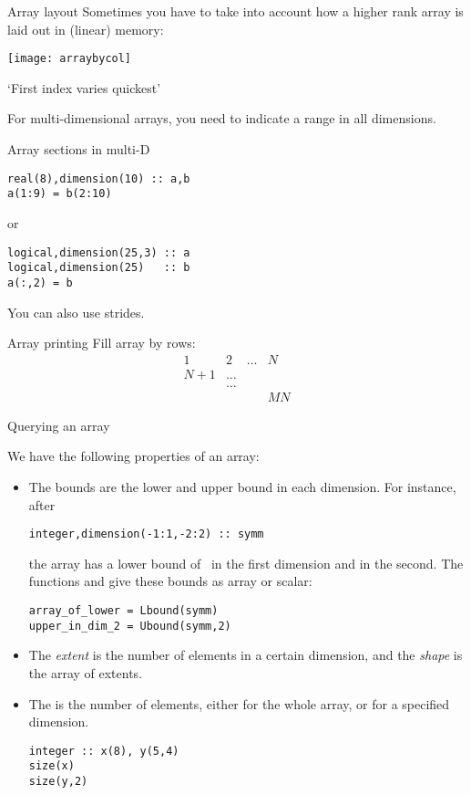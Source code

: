 \begin{block}{Array layout}
  \label{sl:farray-layout}
  Sometimes you have to take into account how a higher rank array
  is laid out in (linear) memory:

  \texttt{[image: arraybycol]}

  `First index varies quickest'
\end{block}

For multi-dimensional arrays, you need to indicate a range in all
dimensions.

\begin{block}{Array sections in multi-D}
  \label{sl:farray-sectiond}
\begin{verbatim}
real(8),dimension(10) :: a,b
a(1:9) = b(2:10)
\end{verbatim}
or
\begin{verbatim}
logical,dimension(25,3) :: a
logical,dimension(25)   :: b
a(:,2) = b
\end{verbatim}
You can also use strides.
\end{block}

\begin{block}{Array printing}
  \label{sl:farray-print}
  Fill array by rows:
  \[ \begin{matrix}1&2&\ldots&N\\ N+1&\ldots\\ &\ldots\\ &&&MN
  \end{matrix}
  \]
\end{block}

 {Querying an array}

We have the following properties of an array:
\begin{itemize}
\item The bounds are the lower and upper bound in each dimension.
  For instance, after
\begin{verbatim}
integer,dimension(-1:1,-2:2) :: symm
\end{verbatim}
the array  has a lower bound of~ in the first dimension
and  in the second. The functions  and
 give these bounds as array or scalar:
\begin{verbatim}
array_of_lower = Lbound(symm)
upper_in_dim_2 = Ubound(symm,2)
\end{verbatim}


\item The \emph{extent} is the number
  of elements in a certain dimension, and the
  \emph{shape} is the array of extents.

\item The  is the number of elements, either for
  the whole array, or for a specified dimension.
\begin{verbatim}
integer :: x(8), y(5,4)
size(x)
size(y,2)
\end{verbatim}
\end{itemize}

